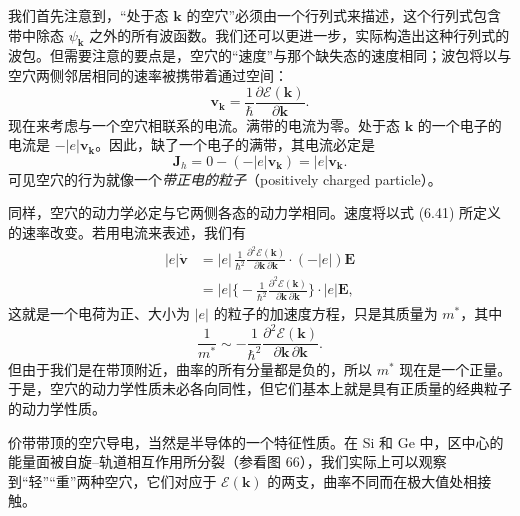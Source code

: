 
我们首先注意到，“处于态 $\mathbf{k}$ 的空穴”必须由一个行列式来描述，这个行列式包含带中除态 $\psi_{\mathbf{k}}$ 之外的所有波函数。我们还可以更进一步，实际构造出这种行列式的波包。但需要注意的要点是，空穴的“速度”与那个缺失态的速度相同；波包将以与空穴两侧邻居相同的速率被携带着通过空间：
\begin{equation*}
\mathbf{v}_{\mathbf{k}}=\frac{1}{\hbar}\frac{\partial\mathcal{E}(\mathbf{k})}{\partial\mathbf{k}}. \tag{6.45}
\end{equation*}
现在来考虑与一个空穴相联系的电流。满带的电流为零。处于态 $\mathbf{k}$ 的一个电子的电流是 $-|e|\mathbf{v}_{\mathbf{k}}$。因此，缺了一个电子的满带，其电流必定是
\begin{equation*}
\mathbf{J}_{h}=0-(-|e|\mathbf{v}_{\mathbf{k}})=|e|\mathbf{v}_{\mathbf{k}}. \tag{6.46}
\end{equation*}
可见空穴的行为就像一个\emph{带正电的粒子}（positively charged particle）。

同样，空穴的动力学必定与它两侧各态的动力学相同。速度将以式 (6.41) 所定义的速率改变。若用电流来表述，我们有
\begin{align*}
|e|\dot{\mathbf{v}}&=|e|\,\frac{1}{\hbar^{2}}\frac{\partial^{2}\mathcal{E}(\mathbf{k})}{\partial\mathbf{k}\,\partial\mathbf{k}}\cdot(-|e|)\mathbf{E}\\
&=|e|\biggl\{-\frac{1}{\hbar^{2}}\frac{\partial^{2}\mathcal{E}(\mathbf{k})}{\partial\mathbf{k}\,\partial\mathbf{k}}\biggr\}\cdot|e|\mathbf{E}, \tag{6.47}
\end{align*}
这就是一个电荷为正、大小为 $|e|$ 的粒子的加速度方程，只是其质量为 $m^{*}$，其中
\begin{equation*}
\frac{1}{m^{*}}\sim-\frac{1}{\hbar^{2}}\frac{\partial^{2}\mathcal{E}(\mathbf{k})}{\partial\mathbf{k}\,\partial\mathbf{k}}. \tag{6.48}
\end{equation*}
但由于我们是在带顶附近，曲率的所有分量都是负的，所以 $m^{*}$ 现在是一个正量。于是，空穴的动力学性质未必各向同性，但它们基本上就是具有正质量的经典粒子的动力学性质。


价带带顶的空穴导电，当然是半导体的一个特征性质。在 Si 和 Ge 中，区中心的能量面被自旋–轨道相互作用所分裂（参看图 66），我们实际上可以观察到“轻”“重”两种空穴，它们对应于 $\mathcal{E}(\mathbf{k})$ 的两支，曲率不同而在极大值处相接触。


